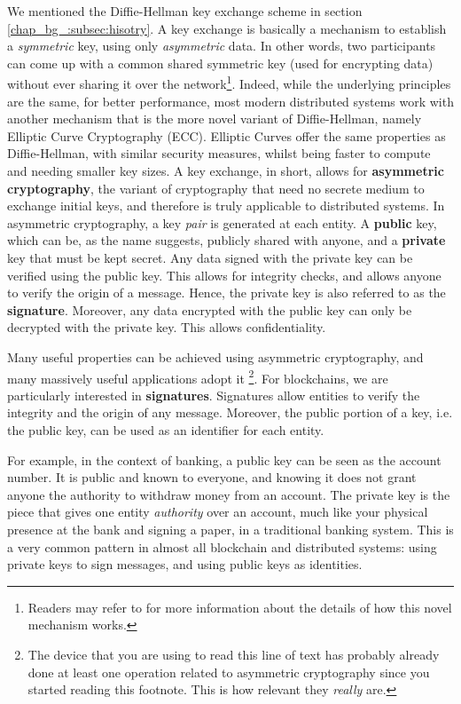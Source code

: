 We mentioned the Diffie-Hellman key exchange scheme in section \ref{chap_bg_:subsec:hisotry}. A key
exchange is basically a mechanism to establish a \textit{symmetric} key, using only
\textit{asymmetric} data. In other words, two participants can come up with a common shared
symmetric key (used for encrypting data) without ever sharing it over the network\footnote{Readers
may refer to \cite{diffieNewDirectionsCryptography1976} for more information about the details of
how this novel mechanism works.}. Indeed, while the underlying principles are the same, for better
performance, most modern distributed systems work with another mechanism that is the more novel
variant of Diffie-Hellman, namely Elliptic Curve Cryptography (ECC). Elliptic Curves offer
the same properties as Diffie-Hellman, with similar security measures, whilst being faster to
compute and needing smaller key sizes. A key exchange, in short, allows for \textbf{asymmetric
cryptography}, the variant of cryptography that need no secrete medium to exchange initial
keys, and therefore is truly applicable to distributed systems. In asymmetric cryptography, a key
\textit{pair} is generated at each entity. A \textbf{public} key, which can be, as the name
suggests, publicly shared with anyone, and a \textbf{private} key that must be kept secret. Any data
signed with the private key can be verified using the public key. This allows for integrity checks,
and allows anyone to verify the origin of a message. Hence, the private key is also referred to as
the \textbf{signature}. Moreover, any data encrypted with the public key can only be decrypted with
the private key. This allows confidentiality.

Many useful properties can be achieved using asymmetric cryptography, and many massively useful
applications adopt it \footnote{The device that you are using to read this line of text has probably
already done at least one operation related to asymmetric cryptography since you started reading
this footnote. This is how relevant they \textit{really} are.}. For blockchains, we are particularly
interested in \textbf{signatures}. Signatures allow entities to verify the integrity and the origin
of any message. Moreover, the public portion of a key, i.e. the public key, can be used as an
identifier for each entity.

For example, in the context of banking, a public key can be seen as the account number. It is public
and known to everyone, and knowing it does not grant anyone the authority to withdraw money from an
account. The private key is the piece that gives one entity \textit{authority} over an account, much
like your physical presence at the bank and signing a paper, in a traditional banking system. This
is a very common pattern in almost all blockchain and distributed systems: using private keys to sign
messages, and using public keys as identities.

